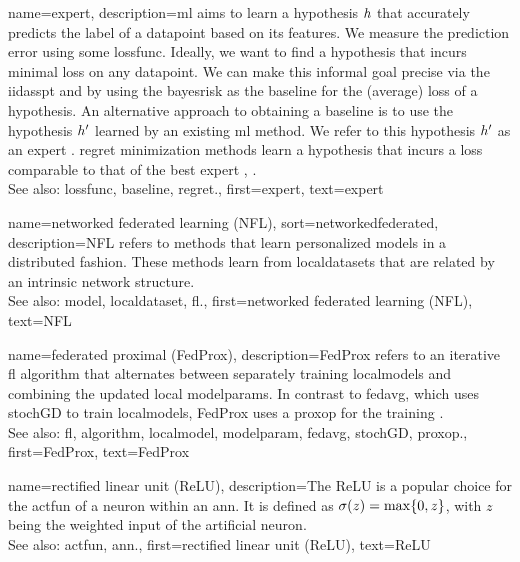 {name={expert},
	description={\gls{ml} aims to learn a \gls{hypothesis} $h$ that accurately predicts the \gls{label} 
		of a \gls{datapoint} based on its \glspl{feature}. We measure the \gls{prediction} error using 
		some \gls{lossfunc}. Ideally, we want to find a \gls{hypothesis} that incurs minimal \gls{loss} 
		on any \gls{datapoint}. We can make this informal goal precise via the \gls{iidasspt} 
		and by using the \gls{bayesrisk} as the \gls{baseline} for the (average) \gls{loss} of a \gls{hypothesis}. 
		An alternative approach to obtaining a \gls{baseline} is to use the \gls{hypothesis} $h'$ learned 
		by an existing \gls{ml} method. We refer to this \gls{hypothesis} $h'$ as an expert \cite{PredictionLearningGames}. 
		\Gls{regret} minimization methods learn a \gls{hypothesis}
		that incurs a \gls{loss} comparable to that of the best expert \cite{PredictionLearningGames}, \cite{HazanOCO}.
					\\ 
		See also: \gls{lossfunc}, \gls{baseline}, \gls{regret}.},
	first={expert},
	text={expert} 
}

{name={networked federated learning (NFL)},
sort={networkedfederated},
	description={NFL refers 
		to methods that learn personalized \glspl{model} in a distributed fashion. These methods learn from \glspl{localdataset} 
		that are related by an intrinsic network structure.
					\\ 
		See also: \gls{model}, \gls{localdataset}, \gls{fl}.},
	first={networked federated learning (NFL)},
	text={NFL} 
}

{name={federated proximal (FedProx)},
	description={FedProx refers to an 
		iterative \gls{fl} \gls{algorithm} that alternates between separately 
		\gls{training} \glspl{localmodel} and combining the updated 
		local \glspl{modelparam}. In contrast to \gls{fedavg}, which uses 
		\gls{stochGD} to train \glspl{localmodel}, FedProx uses a \gls{proxop} 
		for the \gls{training} \cite{FedProx2020}.
					\\ 
		See also: \gls{fl}, \gls{algorithm}, \gls{localmodel}, \gls{modelparam}, \gls{fedavg}, \gls{stochGD}, \gls{proxop}.}, 
	first={FedProx}, 
	text={FedProx} 
}

{name={rectified linear unit (ReLU)},
	description={The ReLU is 
		a popular choice for the \gls{actfun} of a neuron within an \gls{ann}. It is defined 
		as $\sigma(z) = \max\{0,z\}$, with $z$ being the weighted input of the artificial 
		neuron.
					\\ 
		See also: \gls{actfun}, \gls{ann}.}, 
	first={rectified linear unit (ReLU)}, 
	text={ReLU} 
}

